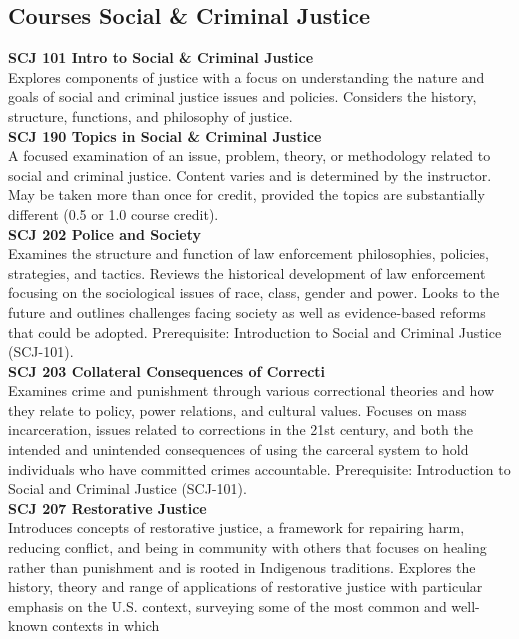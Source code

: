 \documentclass[
  letterpaper,
]{scrbook}
\begin{document}
\subsection{Courses Social \& Criminal
Justice}\label{courses-social-criminal-justice}

\textbf{SCJ 101 Intro to Social \& Criminal Justice}\\
Explores components of justice with a focus on understanding the nature
and goals of social and criminal justice issues and policies. Considers
the history, structure, functions, and philosophy of justice.\\
\textbf{SCJ 190 Topics in Social \& Criminal Justice}\\
A focused examination of an issue, problem, theory, or methodology
related to social and criminal justice. Content varies and is determined
by the instructor. May be taken more than once for credit, provided the
topics are substantially different (0.5 or 1.0 course credit).\\
\textbf{SCJ 202 Police and Society}\\
Examines the structure and function of law enforcement philosophies,
policies, strategies, and tactics. Reviews the historical development of
law enforcement focusing on the sociological issues of race, class,
gender and power. Looks to the future and outlines challenges facing
society as well as evidence-based reforms that could be adopted.
Prerequisite: Introduction to Social and Criminal Justice (SCJ-101).\\
\textbf{SCJ 203 Collateral Consequences of Correcti}\\
Examines crime and punishment through various correctional theories and
how they relate to policy, power relations, and cultural values. Focuses
on mass incarceration, issues related to corrections in the 21st
century, and both the intended and unintended consequences of using the
carceral system to hold individuals who have committed crimes
accountable. Prerequisite: Introduction to Social and Criminal Justice
(SCJ-101).\\
\textbf{SCJ 207 Restorative Justice}\\
Introduces concepts of restorative justice, a framework for repairing
harm, reducing conflict, and being in community with others that focuses
on healing rather than punishment and is rooted in Indigenous
traditions. Explores the history, theory and range of applications of
restorative justice with particular emphasis on the U.S. context,
surveying some of the most common and well-known contexts in which
\end{document}
